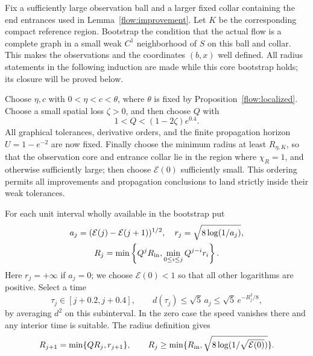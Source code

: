 Fix a sufficiently large observation ball and a larger fixed
collar containing the end entrances used in Lemma~\ref{flow:improvement}.
Let $K$ be the corresponding compact reference region.  Bootstrap the
condition that the actual flow is a
complete graph in a small weak $C^1$ neighborhood of $S$ on
this ball and collar.  This makes the observations and the
coordinates $(b,x)$ well defined.  All radius statements in
the following induction are made while this core bootstrap
holds; its closure will be proved below.

Choose $\eta,c$ with $0<\eta<c<\theta$, where $\theta$ is fixed
by Proposition~\ref{flow:localized}.  Choose a small spatial
loss $\zeta>0$, and then choose $Q$ with
\begin{equation}\label{flow:Q-choice}
 1<Q<(1-2\zeta)e^{0.4}.
\end{equation}
All graphical tolerances, derivative orders, and the finite
propagation horizon $U=1-e^{-2}$ are now fixed.  Finally choose
the minimum radius at least $R_{\eta,K}$, so that the observation core
and entrance collar lie in the region where $\chi_R=1$, and otherwise
sufficiently large; then choose $\mathcal E(0)$ sufficiently
small.  This ordering permits all improvements and propagation
conclusions to land strictly inside their weak tolerances.

For each unit interval wholly available in the bootstrap put
\begin{equation}\label{flow:radii}
 \begin{gathered}
 a_j=(\mathcal E(j)-\mathcal E(j+1))^{1/2},\quad
 r_j=\sqrt{8\log(1/a_j)},\\
 R_j=\min\left\{Q^jR_{\rm in},
                 \min_{0\le i\le j}Q^{j-i}r_i\right\}.
 \end{gathered}
\end{equation}
Here $r_j=+\infty$ if $a_j=0$; we choose $\mathcal E(0)<1$ so that
all other logarithms are positive.  Select a time
\begin{equation}\label{flow:selected-time}
 \tau_j\in[j+0.2,j+0.4],\qquad
 d(\tau_j)\le\sqrt5\,a_j
                     \le\sqrt5\,e^{-R_j^2/8},
\end{equation}
by averaging $d^2$ on this subinterval.  In the zero case the
speed vanishes there and any interior time is suitable.  The
radius definition gives
\begin{equation}\label{flow:radius-recursion}
 R_{j+1}=\min\{QR_j,r_{j+1}\},\qquad
 R_j\ge\min\{R_{\rm in},\sqrt{8\log(1/\sqrt{\mathcal E(0)})}\}.
\end{equation}

